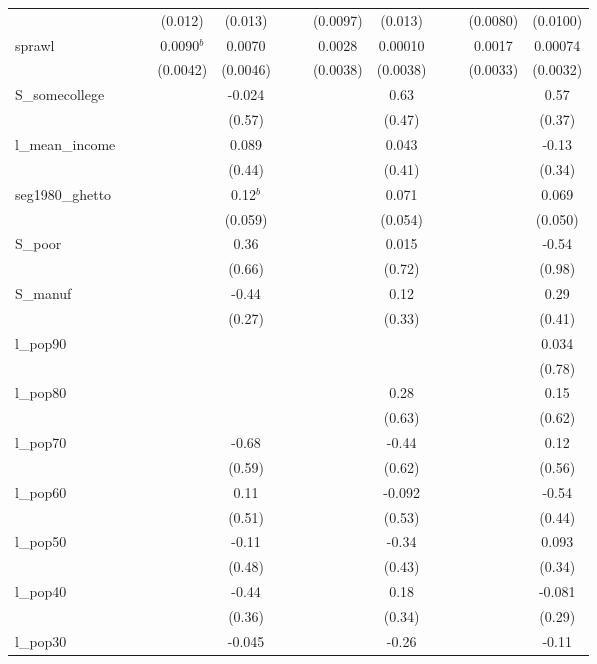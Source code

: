 \documentclass[]{article}
\begin{document}
\begin{tabular}{lcccccccccccc}
 &  &  & (0.012) & (0.013) &  &  & (0.0097) & (0.013) &  &  & (0.0080) & (0.0100) \\
sprawl &  &  & 0.0090$^b$ & 0.0070 &  &  & 0.0028 & 0.00010 &  &  & 0.0017 & 0.00074 \\
 &  &  & (0.0042) & (0.0046) &  &  & (0.0038) & (0.0038) &  &  & (0.0033) & (0.0032) \\
S\_somecollege &  &  &  & -0.024 &  &  &  & 0.63 &  &  &  & 0.57 \\
 &  &  &  & (0.57) &  &  &  & (0.47) &  &  &  & (0.37) \\
l\_mean\_income &  &  &  & 0.089 &  &  &  & 0.043 &  &  &  & -0.13 \\
 &  &  &  & (0.44) &  &  &  & (0.41) &  &  &  & (0.34) \\
seg1980\_ghetto &  &  &  & 0.12$^b$ &  &  &  & 0.071 &  &  &  & 0.069 \\
 &  &  &  & (0.059) &  &  &  & (0.054) &  &  &  & (0.050) \\
S\_poor &  &  &  & 0.36 &  &  &  & 0.015 &  &  &  & -0.54 \\
 &  &  &  & (0.66) &  &  &  & (0.72) &  &  &  & (0.98) \\
S\_manuf &  &  &  & -0.44 &  &  &  & 0.12 &  &  &  & 0.29 \\
 &  &  &  & (0.27) &  &  &  & (0.33) &  &  &  & (0.41) \\
l\_pop90 &  &  &  &  &  &  &  &  &  &  &  & 0.034 \\
 &  &  &  &  &  &  &  &  &  &  &  & (0.78) \\
l\_pop80 &  &  &  &  &  &  &  & 0.28 &  &  &  & 0.15 \\
 &  &  &  &  &  &  &  & (0.63) &  &  &  & (0.62) \\
l\_pop70 &  &  &  & -0.68 &  &  &  & -0.44 &  &  &  & 0.12 \\
 &  &  &  & (0.59) &  &  &  & (0.62) &  &  &  & (0.56) \\
l\_pop60 &  &  &  & 0.11 &  &  &  & -0.092 &  &  &  & -0.54 \\
 &  &  &  & (0.51) &  &  &  & (0.53) &  &  &  & (0.44) \\
l\_pop50 &  &  &  & -0.11 &  &  &  & -0.34 &  &  &  & 0.093 \\
 &  &  &  & (0.48) &  &  &  & (0.43) &  &  &  & (0.34) \\
l\_pop40 &  &  &  & -0.44 &  &  &  & 0.18 &  &  &  & -0.081 \\
 &  &  &  & (0.36) &  &  &  & (0.34) &  &  &  & (0.29) \\
l\_pop30 &  &  &  & -0.045 &  &  &  & -0.26 &  &  &  & -0.11 \\

\end{tabular}
\end{document}
